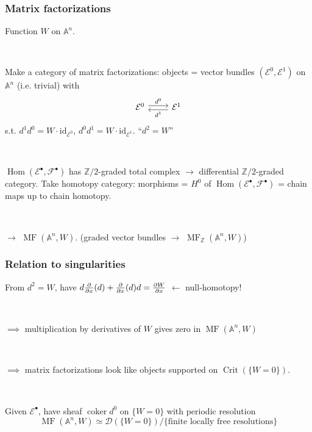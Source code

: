 \documentclass{beamer}
\DeclareMathOperator{\coker}{coker}
\DeclareMathOperator{\Hom}{Hom}
\DeclareMathOperator{\Crit}{Crit}
\DeclareMathOperator{\MF}{MF}
\newcommand{\A}{\mathbb{A}}
\newcommand{\Z}{\mathbb{Z}}
\newcommand{\calD}{\mathcal{D}}
\newcommand{\calE}{\mathcal{E}}
\newcommand{\calF}{\mathcal{F}}
\newcommand{\id}{\mathrm{id}}
\begin{document}
\begin{frame}
    \frametitle{Matrix factorizations}

    Function $W$ on $\A^n$. \pause

    ~

    Make a category of matrix factorizations: \pause objects = vector bundles
    $(\calE^0,\calE^1)$ on $\A^n$ (i.e. trivial) with
    \begin{equation*}
        \begin{tikzcd}[ampersand replacement=\&]
            \calE^0 \ar[r,shift left,"d^0"] \&
            \calE^1 \ar[l,shift left,"d^1"]
        \end{tikzcd}
    \end{equation*}
    s.t. $d^1d^0=W\cdot\id_{\calE^0}$, $d^0d^1 = W\cdot\id_{\calE^1}$. \pause
    ``$d^2=W$'' \pause

    ~

    $\Hom(\calE^\bullet,\calF^\bullet)$ has $\Z/2$-graded total complex \pause
    $\to$ differential $\Z/2$-graded category. \pause Take homotopy category:
    \pause morphisms = $H^0$ of $\Hom(\calE^\bullet,\calF^\bullet)$
    = chain maps up to chain homotopy. \pause


    ~

    $\to$ $\MF(\A^n,W)$. \pause (graded vector bundles $\to$ $\MF_\Z(\A^n,W)$)

\end{frame}

\begin{frame}
    \frametitle{Relation to singularities}

    From $d^2=W$, have $d\pdv{}{x}(d)+\pdv{}{x}(d)d=\pdv{W}{x}$
    \pause $\leftarrow$ null-homotopy! \pause

    ~

    $\implies$ multiplication by derivatives of $W$ gives zero in $\MF(\A^n,W)$
    \pause

    ~

    $\implies$ matrix factorizations look like objects supported on
    $\Crit(\{W=0\})$. \pause

    ~

    Given $\calE^\bullet$, have sheaf $\coker d^0$ on $\{W=0\}$ with periodic
    resolution \pause %
    \begin{equation*}
        \MF(\A^n,W) \simeq \calD(\{W=0\})
            / \{\text{finite locally free resolutions}\}
    \end{equation*}
\end{frame}
\end{document}
